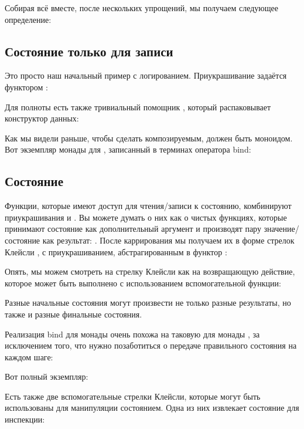 Собирая всё вместе, после нескольких упрощений, мы получаем
следующее определение:


\subsection{Состояние только для записи}

Это просто наш начальный пример с логированием. Приукрашивание задаётся
функтором :

Для полноты есть также тривиальный помощник , который
распаковывает конструктор данных:

Как мы видели раньше, чтобы сделать  композируемым,
 должен быть моноидом. Вот экземпляр монады для
, записанный в терминах оператора bind:


\subsection{Состояние}

Функции, которые имеют доступ для чтения/записи к состоянию, комбинируют
приукрашивания  и . Вы можете
думать о них как о чистых функциях, которые принимают состояние как дополнительный аргумент
и производят пару значение/состояние как результат:
. После каррирования мы получаем их
в форме стрелок Клейсли
, с
приукрашиванием, абстрагированным в функтор :

Опять, мы можем смотреть на стрелку Клейсли как на возвращающую действие, которое может
быть выполнено с использованием вспомогательной функции:

Разные начальные состояния могут произвести не только разные результаты, но
также и разные финальные состояния.

Реализация bind для монады  очень похожа
на таковую для монады , за исключением того, что нужно позаботиться
о передаче правильного состояния на каждом шаге:

Вот полный экземпляр:

Есть также две вспомогательные стрелки Клейсли, которые могут быть использованы для манипуляции
состоянием. Одна из них извлекает состояние для инспекции:


